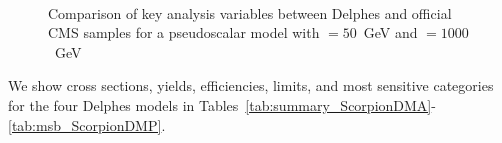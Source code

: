 \begin{figure}
    \begin{center}
         ~~
         ~~
         ~~
        \caption{Comparison of key analysis variables between Delphes and official CMS samples for a pseudoscalar model with \mchi$=50$~GeV and \mphi$=1000$~GeV}
        \label{fig:delphesVSofficial}
    \end{center}
\end{figure}

We show cross sections, yields, efficiencies, limits, and most sensitive 
categories for the four Delphes models in 
Tables~\ref{tab:summary_ScorpionDMA}-\ref{tab:msb_ScorpionDMP}.

%




